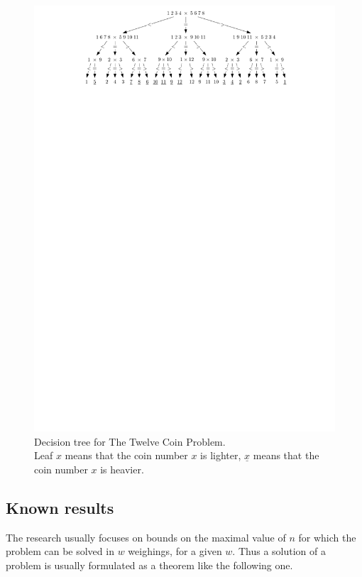 \begin{figure}[h]
\includegraphics[width=\textwidth]{pictures/coins12.pdf}
\caption{Decision tree for The Twelve Coin Problem. \\
Leaf $x$ means that the coin number $x$ is lighter, $\underline{x}$ means that
the coin number $x$ is heavier.}
\label{fig:coins12tree}
\end{figure}

\subsection{Known results}

The research usually focuses on bounds on the maximal value of $n$
  for which the problem can be solved in $w$ weighings, for a given $w$.
Thus a solution of a problem is usually formulated as a theorem like the
  following one.

